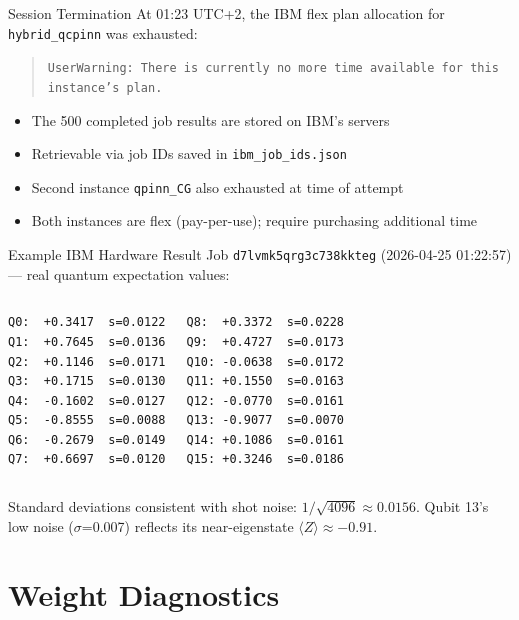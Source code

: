 \documentclass[aspectratio=169]{beamer}
\begin{document}
\begin{frame}{Session Termination}
At 01:23 UTC+2, the IBM flex plan allocation for \texttt{hybrid\_qcpinn} was exhausted:

\begin{quote}
\small\texttt{UserWarning: There is currently no more time available for this instance's plan.}
\end{quote}

\vspace{0.3cm}
\begin{itemize}
  \item The 500 completed job results are stored on IBM's servers
  \item Retrievable via job IDs saved in \texttt{ibm\_job\_ids.json}
  \item Second instance \texttt{qpinn\_CG} also exhausted at time of attempt
  \item Both instances are flex (pay-per-use); require purchasing additional time
\end{itemize}
\end{frame}

\begin{frame}{Example IBM Hardware Result}
Job \texttt{d7lvmk5qrg3c738kkteg} (2026-04-25 01:22:57) --- real quantum expectation values:

\footnotesize
\begin{columns}
\begin{verbatim}
Q0:  +0.3417  s=0.0122
Q1:  +0.7645  s=0.0136
Q2:  +0.1146  s=0.0171
Q3:  +0.1715  s=0.0130
Q4:  -0.1602  s=0.0127
Q5:  -0.8555  s=0.0088
Q6:  -0.2679  s=0.0149
Q7:  +0.6697  s=0.0120
\end{verbatim}
\begin{verbatim}
Q8:  +0.3372  s=0.0228
Q9:  +0.4727  s=0.0173
Q10: -0.0638  s=0.0172
Q11: +0.1550  s=0.0163
Q12: -0.0770  s=0.0161
Q13: -0.9077  s=0.0070
Q14: +0.1086  s=0.0161
Q15: +0.3246  s=0.0186
\end{verbatim}
\end{columns}

\normalsize
Standard deviations consistent with shot noise: $1/\sqrt{4096} \approx 0.0156$. Qubit 13's low noise ($\sigma$=0.007) reflects its near-eigenstate $\langle Z \rangle \approx -0.91$.
\end{frame}

\section{Weight Diagnostics}
\end{document}
